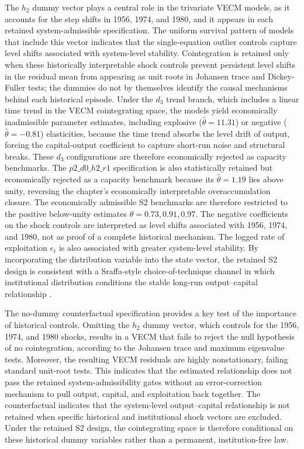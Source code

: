 \documentclass[11pt]{article}
\begin{document}
The $h_2$ dummy vector plays a central role in the trivariate VECM models, as it accounts for the step shifts in 1956, 1974, and 1980, and it appears in each retained system-admissible specification. The uniform survival pattern of models that include this vector indicates that the single-equation outlier controls capture level shifts associated with system-level stability. Cointegration is retained only when these historically interpretable shock controls prevent persistent level shifts in the residual mean from appearing as unit roots in Johansen trace and Dickey-Fuller tests; the dummies do not by themselves identify the causal mechanisms behind each historical episode. Under the $d_3$ trend branch, which includes a linear time trend in the VECM cointegrating space, the models yield economically inadmissible parameter estimates, including explosive ($\hat{\theta} = 11.31$) or negative ($\hat{\theta} = -0.81$) elasticities, because the time trend absorbs the level drift of output, forcing the capital-output coefficient to capture short-run noise and structural breaks. These $d_3$ configurations are therefore economically rejected as capacity benchmarks. The $p2\_d0\_h2\_r1$ specification is also statistically retained but economically rejected as a capacity benchmark because its $\hat{\theta}=1.19$ lies above unity, reversing the chapter's economically interpretable overaccumulation closure. The economically admissible S2 benchmarks are therefore restricted to the positive below-unity estimates $\hat{\theta}=0.73, 0.91, 0.97$. The negative coefficients on the shock controls are interpreted as level shifts associated with 1956, 1974, and 1980, not as proof of a complete historical mechanism. The logged rate of exploitation $e_t$ is also associated with greater system-level stability. By incorporating the distribution variable into the state vector, the retained S2 design is consistent with a Sraffa-style choice-of-technique channel in which institutional distribution conditions the stable long-run output--capital relationship \citep{Kurz1986}.

The no-dummy counterfactual specification provides a key test of the importance of historical controls. Omitting the $h_2$ dummy vector, which controls for the 1956, 1974, and 1980 shocks, results in a VECM that fails to reject the null hypothesis of no cointegration, according to the Johansen trace and maximum eigenvalue tests. Moreover, the resulting VECM residuals are highly nonstationary, failing standard unit-root tests. This indicates that the estimated relationship does not pass the retained system-admissibility gates without an error-correction mechanism to pull output, capital, and exploitation back together. The counterfactual indicates that the system-level output--capital relationship is not retained when specific historical and institutional shock vectors are excluded. Under the retained S2 design, the cointegrating space is therefore conditional on these historical dummy variables rather than a permanent, institution-free law.
\end{document}
